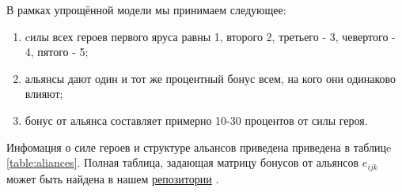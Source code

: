 \documentclass{article}
\begin{document}
В рамках упрощённой модели мы принимаем следующее:
\begin{enumerate}
\item cилы всех героев первого яруса равны 1, второго 2, третьего - 3, чевертого - 4, пятого - 5;
\item альянсы дают один и тот же процентный бонус всем, на кого они одинаково влияют;
\item бонус от альянса составляет примерно 10-30 процентов от силы героя.
\end{enumerate}

Инфомация о силе героев и структуре альансов приведена приведена в таблицe \ref{table:aliances}. 
Полная таблица, задающая матрицу бонусов от альянсов $e_{ijk}$ может быть найдена в нашем \href{https://github.com/aponom84/UnderLords/blob/master/UnderLordsData.xlsx}{репозитории} \cite{UnderLordsInput}.
\end{document}
